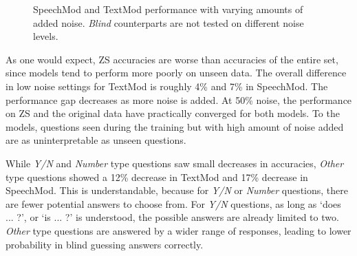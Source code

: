 \documentclass[letterpaper]{article} %
\begin{document}
\pgfplotsset{width=8cm,compat=1.9}
\begin{figure}[t]
\centering
{}
\caption{SpeechMod and TextMod performance with varying amounts of added noise. \textit{Blind} counterparts are not tested on different noise levels.}
\label{fig:noiseplots-zs}
\end{figure}

As one would expect, ZS accuracies are worse than accuracies of the entire set, since models tend to perform more poorly on unseen data. The overall difference in low noise settings for TextMod is roughly 4\% and 7\% in SpeechMod. The performance gap decreases as more noise is added. At 50\% noise, the performance on ZS and the original data have practically converged for both models. To the models, questions seen during the training but with high amount of noise added are as uninterpretable as unseen questions.

While \textit{Y/N} and \textit{Number} type questions saw small decreases in accuracies, \textit{Other} type questions showed a 12\% decrease in TextMod and 17\% decrease in SpeechMod. This is understandable, because for \textit{Y/N} or \textit{Number} questions, there are fewer potential answers to choose from. For \textit{Y/N} questions, as long as `does ... ?', or `is ... ?' is understood, the possible answers are already limited to two. \textit{Other} type questions are answered by a wider range of responses, leading to lower probability in blind guessing answers correctly.
\end{document}
